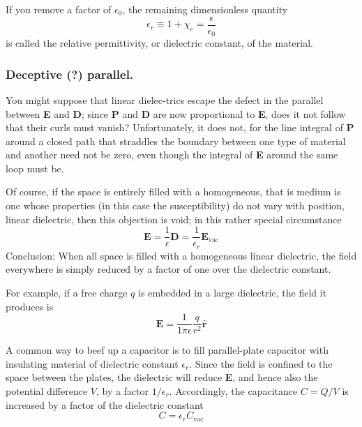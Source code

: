 \documentclass[../../../main.tex]{subfiles}
\begin{document}
If you remove a factor of $\epsilon_0$, the remaining dimensionless quantity
\begin{equation*}
    \epsilon_r\equiv1+\chi_e=\frac{\epsilon}{\epsilon_0}
\end{equation*}
is called the relative permittivity, or dielectric constant, of the material.

\subsubsection*{Deceptive (?) parallel.} You might suppose that linear dielec-trics escape the defect in the parallel between \textbf{E} and \textbf{D}; since \textbf{P} and \textbf{D} are now proportional to \textbf{E}, does it not follow that their curls must vanish? Unfortunately, it does not, for the line integral of \textbf{P} around a closed path that straddles the boundary between one type of material and another need not be zero, even though the integral of \textbf{E} around the same loop must be.

Of course, if the space is entirely ﬁlled with a homogeneous, that is medium is one whose properties (in this case the susceptibility) do not vary with position, linear dielectric, then this objection is void; in this rather special circumstance
\begin{equation*}
    \mathbf{E}=\frac{1}{\epsilon}\mathbf{D}=\frac{1}{\epsilon_r}\mathbf{E}_{\text{vac}}
\end{equation*}
Conclusion: When all space is filled with a homogeneous linear dielectric, the field everywhere is simply reduced by a factor of one over the dielectric constant.

For example, if a free charge $q$ is embedded in a large dielectric, the field it produces is
\begin{equation*}
    \mathbf{E}=\frac{1}{1\pi\epsilon}\frac{q}{r^2}\mathbf{\hat{r}}
\end{equation*}

A common way to beef up a capacitor is to fill parallel-plate capacitor with insulating material of dielectric constant $\epsilon_r$. Since the field is confined to the space between the plates, the dielectric will reduce \textbf{E}, and hence also the potential difference $V$, by a factor $1/\epsilon_r$. Accordingly, the capacitance $C = Q/V$ is increased by a factor of the dielectric constant
\begin{equation*}
    C=\epsilon_rC_{\text{vac}}
\end{equation*}
\end{document}
